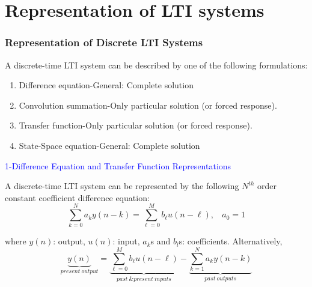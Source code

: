 \documentclass[mathserif, 10pt]{beamer} %
\begin{document}
\section{Representation of LTI systems}

\frame
{

\normalsize

\frametitle{Representation of Discrete LTI Systems}
A discrete-time LTI system can be described by one of the following formulations:\\ \vspace{.2in}
\vspace{-.15in}
\begin{enumerate}
	\item Difference equation-General: Complete solution
	\item Convolution summation-Only particular solution (or forced response).
	\item Transfer function-Only particular solution (or forced response).
	\item State-Space equation-General: Complete solution
\end{enumerate}

\textcolor{blue}{1-Difference Equation and Transfer Function Representations}

A discrete-time LTI system can be represented by the following $N^{th}$ order constant coefficient difference equation:\\
\[\sum\limits_{k=0}^N a_k y(n-k) = \sum\limits_{\ell=0}^M b_{\ell} u(n-\ell), ~~~~a_0 = 1\]

where $y(n)$: output, $u(n)$: input,  $a_k$s and $b_l$s: coefficients. Alternatively,
\[\underbrace{y(n)}_{present~output} = \underbrace{\sum\limits_{\ell = 0}^M b_{\ell} u(n-\ell)}_{past~ \& present~inputs}-\underbrace{\sum\limits_{k=1}^N a_k y(n-k)}_{past~outputs}\]

}
\end{document}
